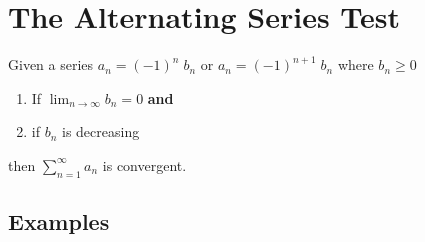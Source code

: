 \documentclass[12pt]{report}
\begin{document}
\section{The Alternating Series Test}
Given a series $a_n = (-1)^n \; b_n $ or $ a_n = (-1)^{n+1} \; b_n $ where $ b_n \geq 0 $

\begin{enumerate}
	\item If $ \lim_{n\to\infty} b_n = 0 $ \textbf{and}
	\item if $ b_n $ is decreasing
\end{enumerate}

\noindent then $ \sum_{n=1}^{\infty} a_n $ is convergent.


\subsection*{Examples}
\end{document}
